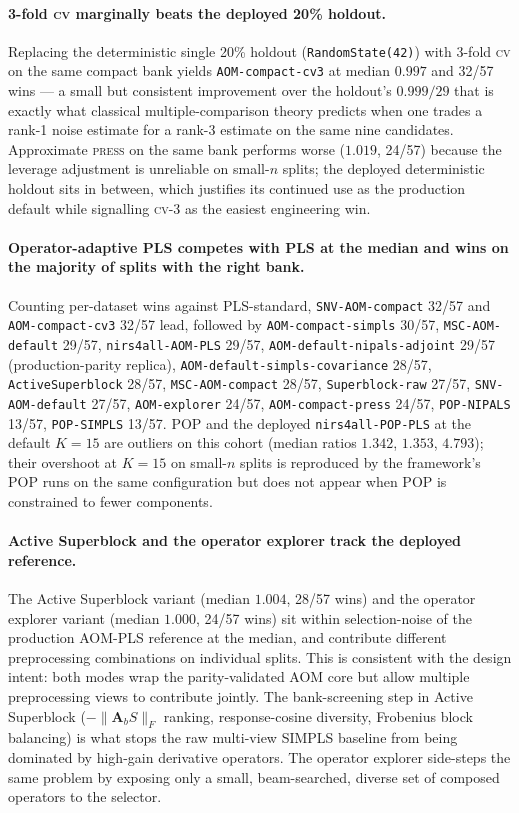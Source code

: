 \documentclass[review,a4paper]{elsarticle}
\newcommand{\Amat}{\mathbf{A}}
\newcommand{\AOM}{\textsc{AOM}\xspace}
\newcommand{\POP}{\textsc{POP}\xspace}
\newcommand{\PLS}{\textsc{PLS}\xspace}
\newcommand{\SIMPLS}{\textsc{SIMPLS}\xspace}
\begin{document}
\paragraph{3-fold \textsc{cv} marginally beats the deployed 20\%
holdout.} Replacing the deterministic single 20\% holdout
(\texttt{RandomState(42)}) with 3-fold \textsc{cv} on the same compact
bank yields \texttt{AOM-compact-cv3} at median $0.997$ and 32/57 wins
— a small but consistent improvement over the holdout's
$0.999 / 29$ that is exactly what classical multiple-comparison theory
predicts when one trades a rank-1 noise estimate for a rank-3 estimate
on the same nine candidates. Approximate \textsc{press} on the same
bank performs worse ($1.019$, 24/57) because the leverage adjustment
is unreliable on small-$n$ splits; the deployed deterministic holdout
sits in between, which justifies its continued use as the production
default while signalling \textsc{cv}-3 as the easiest engineering win.

\paragraph{Operator-adaptive \PLS competes with \PLS at the median and
wins on the majority of splits with the right bank.}
Counting per-dataset wins against \PLS-standard, \texttt{SNV-AOM-compact}
32/57 and \texttt{AOM-compact-cv3} 32/57 lead, followed by
\texttt{AOM-compact-simpls} 30/57, \texttt{MSC-AOM-default} 29/57,
\texttt{nirs4all-AOM-PLS} 29/57, \texttt{AOM-default-nipals-adjoint}
29/57 (production-parity replica), \texttt{AOM-default-simpls-covariance} 28/57,
\texttt{ActiveSuperblock} 28/57, \texttt{MSC-AOM-compact} 28/57,
\texttt{Superblock-raw} 27/57, \texttt{SNV-AOM-default} 27/57,
\texttt{AOM-explorer} 24/57, \texttt{AOM-compact-press} 24/57,
\texttt{POP-NIPALS} 13/57, \texttt{POP-SIMPLS} 13/57. \POP and the
deployed \texttt{nirs4all-POP-PLS} at the default $K{=}15$ are outliers
on this cohort (median ratios $1.342$, $1.353$, $4.793$); their
overshoot at $K{=}15$ on small-$n$ splits is reproduced by the
framework's \POP runs on the same configuration but does not appear
when \POP is constrained to fewer components.

\paragraph{Active Superblock and the operator explorer track the
deployed reference.}
The Active Superblock variant (median $1.004$, 28/57 wins) and the
operator explorer variant (median $1.000$, 24/57 wins) sit within
selection-noise of the production \AOM-\PLS reference at the median,
and contribute different preprocessing combinations on individual
splits. This is consistent with the design intent: both modes wrap
the parity-validated \AOM core but allow multiple preprocessing views
to contribute jointly. The bank-screening step in Active Superblock
($-\|\Amat_b S\|_F$ ranking, response-cosine diversity, Frobenius
block balancing) is what stops the raw multi-view \SIMPLS baseline
from being dominated by high-gain derivative operators. The operator
explorer side-steps the same problem by exposing only a small,
beam-searched, diverse set of composed operators to the selector.
\end{document}
